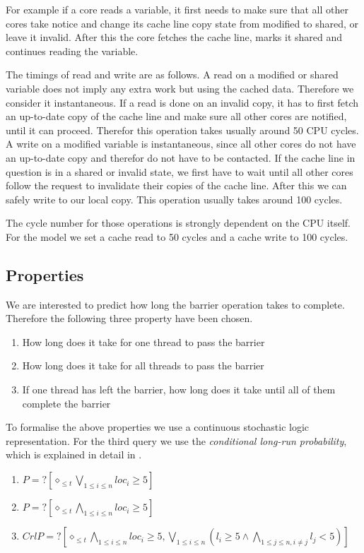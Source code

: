 \documentclass[a4paper, 10pt]{article}
\begin{document}
For example if a core reads a variable, it first needs to make sure that all other cores take notice and change its cache line copy state from modified to shared, or leave it invalid. After this the core fetches the cache line, marks it shared and continues reading the variable.

The timings of read and write are as follows. A read on a modified or shared variable does not imply any extra work but using the cached data. Therefore we consider it instantaneous. If a read is done on an invalid copy, it has to first fetch an up-to-date copy of the cache line and make sure all other cores are notified, until it can proceed. Therefor this operation takes usually around 50 CPU cycles. A write on a modified variable is instantaneous, since all other cores do not have an up-to-date copy and therefor do not have to be contacted. If the cache line in question is in a shared or invalid state, we first have to wait until all other cores follow the request to invalidate their copies of the  cache line. After this we can safely write to our local copy. This operation usually takes around 100 cycles.

The cycle number for those operations is strongly dependent on the CPU itself. For the model we set a cache read to 50 cycles and a cache write to 100 cycles.
\subsection{Properties}
We are interested to predict how long the barrier operation takes to complete. Therefore the following three property have been chosen.
\begin{enumerate}
	\item How long does it take for one thread to pass the barrier
	\item How long does it take for all threads to pass the barrier
	\item If one thread has left the barrier, how long does it take until all of them complete the barrier
\end{enumerate}

To formalise the above properties we use a continuous stochastic logic\cite{assb96}\cite{bkh99} representation. For the third query we use the \emph{conditional long-run probability}, which is explained in detail in \cite{fmix}.
\begin{enumerate}
	\item $P=? [\diamond_{\le t} \bigvee_{1 \le i \le n} loc_i \ge 5]$
	\item $P=? [\diamond_{\le t} \bigwedge_{1 \le i \le n} loc_i \ge 5]$
	\item $CrlP=? [\diamond_{\le t} \bigwedge_{1 \le i \le n} loc_i \ge 5, \bigvee_{1 \le i \le n} (l_i \ge 5 \wedge \bigwedge_{1 \le j \le n, i \neq j} l_j < 5)]$
\end{enumerate}
\end{document}
